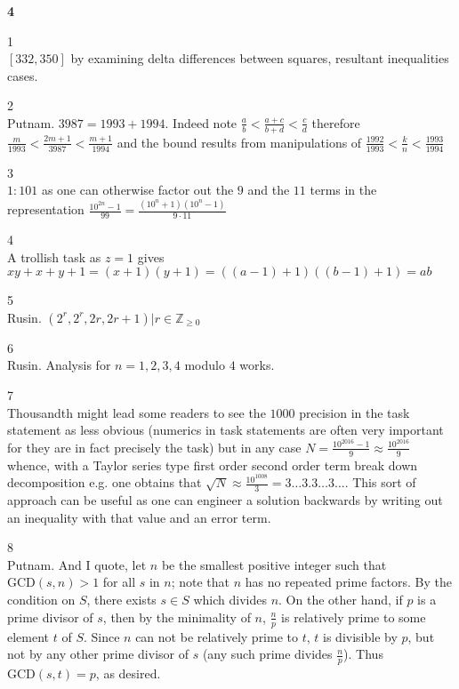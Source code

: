 \newpage

\textbf{4}

1 \\
$\boxed{[332,350]}$ by examining delta differences between squares, resultant inequalities cases.

2 \\
Putnam. $\boxed{3987}=1993+1994$. Indeed note $\frac{a}{b} < \frac{a+c}{b+d} < \frac{c}{d}$ therefore $\frac{m}{1993} < \frac{2m+1}{3987} < \frac{m+1}{1994}$ and the bound results from manipulations of $\frac{1992}{1993} < \frac{k}{n} < \frac{1993}{1994}$

3 \\
$\boxed{1: 101}$ as one can otherwise factor out the $9$ and the $11$ terms in the representation $\frac{10^{2n}-1}{99}=\frac{(10^n+1)(10^n-1)}{9 \cdot 11}$

4 \\
A trollish task as $z=1$ gives $xy+x+y+1=(x+1)(y+1)=((a-1)+1)((b-1)+1)=ab$

5 \\
Rusin. $\boxed{(2^r,2^r,2r,2r+1)|r\in\mathbb{Z}_{\ge 0}}$

6 \\
Rusin. Analysis for $n=1,2,3,4$ modulo $4$ works.

7 \\
Thousandth might lead some readers to see the $1000$ precision in the task statement as less obvious (numerics in task statements are often very important for they are in fact precisely the task) but in any case $N=\frac{10^{2016}-1}{9}\approx \frac{10^{2016}}{9}$ whence, with a Taylor series type first order second order term break down decomposition e.g. one obtains that $\sqrt{N}\approx \frac{10^{1008}}{3}=3\dots 3.3\dots \boxed{3}\dots$. This sort of approach can be useful as one can engineer a solution backwards by writing out an inequality with that value and an error term.

8 \\
Putnam. And I quote, let $n$ be the smallest positive integer such that $\text{GCD}(s,n)>1$ for all $s$ in $n$; note that $n$ has no repeated prime factors. By the condition on $S$, there exists $s\in S$ which divides $n$. On the other hand, if $p$ is a prime divisor of $s$, then by the minimality of $n$, $\frac{n}{p}$ is relatively prime to some element $t$ of $S$. Since $n$ can not be relatively prime to $t$, $t$ is divisible by $p$, but not by any other prime divisor of $s$ (any such prime divides $\frac{n}{p}$). Thus $\text{GCD}(s,t)=p$, as desired.

